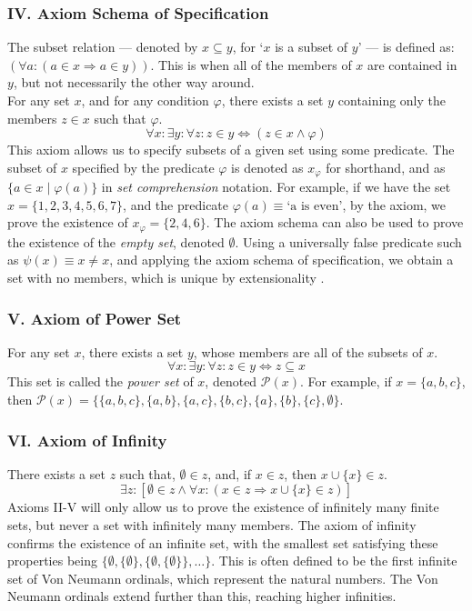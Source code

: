 \documentclass[11pt]{report}
\theoremstyle{definition}
\theoremstyle{theorem}
\theoremstyle{lemma}
\begin{document}
\subsubsection*{IV. Axiom Schema of Specification}
The subset relation --- denoted by $x\subseteq y$, for `$x$ is a subset of $y$' --- is defined as: $(\forall a: (a\in x \Rightarrow a\in y))$. This is when all of the members of $x$ are contained in $y$, but not necessarily the other way around.\\
\noindent
For any set $x$, and for any condition $\varphi$, there exists a set $y$ containing only the members $z \in x$ such that $\varphi$.
$$\forall x: \exists y: \forall z: z\in y \Leftrightarrow (z \in x \wedge \varphi)$$
This axiom allows us to specify subsets of a given set using some predicate. The subset of $x$ specified by the predicate $\varphi$ is denoted as $x_\varphi$ for shorthand, and as $\{a\in x \mid \varphi(a)\}$ in \emph{set comprehension} notation. 
For example, if we have the set $x = \{1,2,3,4,5,6,7\}$, and the predicate $\varphi(a) \equiv \text{`a is even'}$, by the axiom, we prove the existence of $x_\varphi = \{2,4,6\}$.
The axiom schema can also be used to prove the existence of the \emph{empty set}, denoted $\emptyset$. 
Using a universally false predicate such as $\psi(x) \equiv x\neq x$, and applying the axiom schema of specification, we obtain a set with no members, which is unique by extensionality . 

\subsubsection*{V. Axiom of Power Set}
For any set $x$, there exists a set $y$, whose members are all of the subsets of $x$.
$$\forall x: \exists y: \forall z: z\in y \Leftrightarrow z \subseteq x$$
This set is called the \emph{power set} of $x$, denoted $\mathcal{P}(x)$.
For example, if $x = \{a,b,c\}$, then $\mathcal{P}(x) = \{\{a,b,c\},\{a,b\},\{a,c\},\{b,c\}, \{a\}, \{b\}, \{c\}, \emptyset\}$.

\subsubsection*{VI. Axiom of Infinity}
There exists a set $z$ such that, $\emptyset \in z$, and, if $x\in z$, then $x \cup \{x\}\in z$.
$$\exists z: [\emptyset\in z \wedge \forall x: (x\in z \Rightarrow x \cup \{x\}\in z)]$$
Axioms II-V will only allow us to prove the existence of infinitely many finite sets, but never a set with infinitely many members. 
The axiom of infinity confirms the existence of an infinite set, with the smallest set satisfying these properties being $\{ \emptyset, \{\emptyset\}, \{\emptyset, \{\emptyset\}\},\ldots \}$. 
This is often defined to be the first infinite set of Von Neumann ordinals, which represent the natural numbers. 
The Von Neumann ordinals extend further than this, reaching higher infinities.
\end{document}
